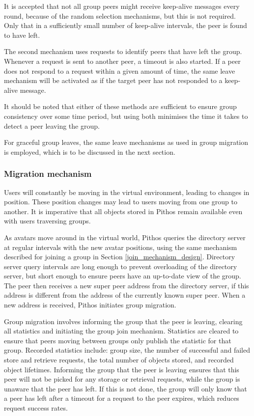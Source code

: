 It is accepted that not all group peers might receive keep-alive messages every round, because of the random selection mechanisms, but this is not required. Only that in a sufficiently small number of keep-alive intervals, the peer is found to have left.

The second mechanism uses requests to identify peers that have left the group. Whenever a request is sent to another peer, a timeout is also started. If a peer does not respond to a request within a given amount of time, the same leave mechanism will be activated as if the target peer has not responded to a keep-alive message.

It should be noted that either of these methods are sufficient to ensure group consistency over some time period, but using both minimises the time it takes to detect a peer leaving the group.

For graceful group leaves, the same leave mechanisms as used in group migration is employed, which is to be discussed in the next section.

\subsubsection{Migration mechanism}
\label{migration_design}

Users will constantly be moving in the virtual environment, leading to changes in position. These position changes may lead to users moving from one group to another. It is imperative that all objects stored in Pithos remain available even with users traversing groups.

As avatars move around in the virtual world, Pithos queries the directory server at regular intervals with the new avatar positions, using the same mechanism described for joining a group in Section \ref{join_mechanism_design}. Directory server query intervals are long enough to prevent overloading of the directory server, but short enough to ensure peers have an up-to-date view of the group. The peer then receives a new super peer address from the directory server, if this address is different from the address of the currently known super peer. When a new address is received, Pithos initiates group migration.

Group migration involves informing the group that the peer is leaving, clearing all statistics and initiating the group join mechanism. Statistics are cleared to ensure that peers moving between groups only publish the statistic for that group. Recorded statistics include: group size, the number of successful and failed store and retrieve requests, the total number of objects stored, and recorded object lifetimes. Informing the group that the peer is leaving ensures that this peer will not be picked for any storage or retrieval requests, while the group is unaware that the peer has left. If this is not done, the group will only know that a peer has left after a timeout for a request to the peer expires, which reduces request success rates.

